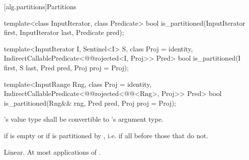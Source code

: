 [alg.partitions]{Partitions}

%
\begin{removedblock}
\begin{itemdecl}
template<class InputIterator, class Predicate>
  bool is_partitioned(InputIterator first, InputIterator last, Predicate pred);
\end{itemdecl}
\end{removedblock}
\begin{addedblock}
\begin{itemdecl}
template<InputIterator I, Sentinel<I> S, class Proj = identity,
    IndirectCallablePredicate<@@rojected<I, Proj>> Pred>
  bool is_partitioned(I first, S last, Pred pred, Proj proj = Proj{});

template<InputRange Rng, class Proj = identity,
    IndirectCallablePredicate<@@rojected<@@<Rng>, Proj>> Pred>
  bool
    is_partitioned(Rng&& rng, Pred pred, Proj proj = Proj{});
\end{itemdecl}
\end{addedblock}

\begin{itemdescr}
\begin{removedblock}
\pnum
\requires {}'s value type shall be convertible to 's argument type.
\end{removedblock}

\pnum
\returns {} if
 is empty or if
 is partitioned by , i.e. if all
 before those that do not.

\pnum
\complexity Linear. At most  applications of .
\end{itemdescr}

